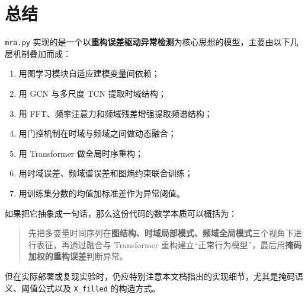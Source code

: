 \documentclass[UTF8]{ctexart}
\begin{document}
\section{总结}

\texttt{mra.py} 实现的是一个以\textbf{重构误差驱动异常检测}为核心思想的模型，主要由以下几层机制叠加而成：
\begin{enumerate}
    \item 用图学习模块自适应建模变量间依赖；
    \item 用 GCN 与多尺度 TCN 提取时域结构；
    \item 用 FFT、频率注意力和频域残差增强提取频谱结构；
    \item 用门控机制在时域与频域之间做动态融合；
    \item 用 Transformer 做全局时序重构；
    \item 用时域误差、频域谱误差和图熵约束联合训练；
    \item 用训练集分数的均值加标准差作为异常阈值。
\end{enumerate}

如果把它抽象成一句话，那么这份代码的数学本质可以概括为：
\begin{quote}
    先把多变量时间序列在\textbf{图结构、时域局部模式、频域全局模式}三个视角下进行表征，再通过融合与 Transformer 重构建立“正常行为模型”，最后用\textbf{掩码加权的重构误差}判断异常。
\end{quote}

但在实际部署或复现实验时，仍应特别注意本文档指出的实现细节，尤其是掩码语义、阈值公式以及 \texttt{X\_filled} 的构造方式。
\end{document}
